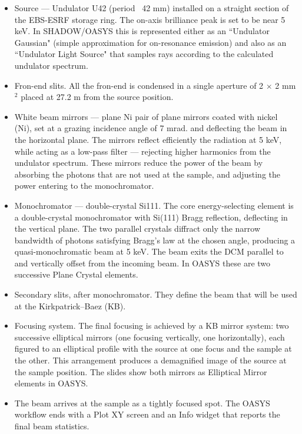 \begin{itemize}
    \item Source — Undulator U42 (period ~42 mm) installed on a straight section of the EBS-ESRF storage ring. The on-axis brilliance peak is set to be near 5 keV.
    In SHADOW/OASYS this is represented either as an ``Undulator Gaussian" (simple approximation for on-resonance emission) and also as an ``Undulator Light Source" that samples rays according to the calculated undulator spectrum. 
    \item Fron-end slits. All the fron-end is condensed in a single aperture of 2 $\times$ 2 mm$^2$ placed at 27.2 m from the source position.
    \item White beam mirrors — plane Ni pair of plane mirrors coated with nickel (Ni), set at a grazing incidence angle of 7 mrad. and deflecting the beam in the horizontal plane. The mirrors reflect efficiently the radiation at 5 keV, while acting as a low-pass filter — rejecting higher harmonics from the undulator spectrum. These mirrors reduce the power of the beam by absorbing the photons that are not used at the sample, and adjusting the power entering to the monochromator.
    \item Monochromator — double-crystal Si111. The core energy-selecting element is a double-crystal monochromator with Si(111) Bragg reflection, deflecting in the vertical plane.
    The two parallel crystals diffract only the narrow bandwidth of photons satisfying Bragg's law at the chosen angle, producing a quasi-monochromatic beam at 5 keV.
    The beam exits the DCM parallel to and vertically offset from the incoming beam. In OASYS these are two successive Plane Crystal elements.    
    \item Secondary slits, after monochromator. They define the beam that will be used at the Kirkpatrick–Baez (KB). 
    \item Focusing system. The final focusing is achieved by a KB mirror system: two successive elliptical mirrors (one focusing vertically, one horizontally), each figured to an elliptical profile with the source at one focus and the sample at the other. This arrangement produces a demagnified image of the source at the sample position. The slides show both mirrors as Elliptical Mirror elements in OASYS.
    \item The beam arrives at the sample as a tightly focused spot. The OASYS workflow ends with a Plot XY screen and an Info widget that reports the final beam statistics.
\end{itemize}



